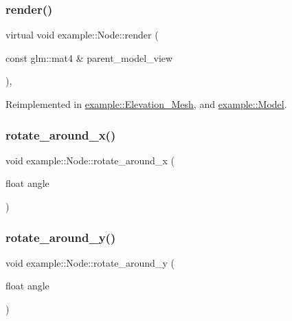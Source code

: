 \subsubsection{\texorpdfstring{render()}{render()}}
{\footnotesize\ttfamily virtual void example\+::\+Node\+::render (\begin{DoxyParamCaption}\item[{const glm\+::mat4 \&}]{parent\+\_\+model\+\_\+view }\end{DoxyParamCaption})\hspace{0.3cm}{\ttfamily [inline]}, {\ttfamily [virtual]}}



Reimplemented in \mbox{\hyperlink{classexample_1_1_elevation___mesh_a6af1c74193b5e68d638382caa08f1d1a}{example\+::\+Elevation\+\_\+\+Mesh}}, and \mbox{\hyperlink{classexample_1_1_model_ab280b30836095117f49acc5dfa92daf9}{example\+::\+Model}}.

\mbox{\label{classexample_1_1_node_ab4eff1ab9218668c46dcb2d436db93be}} 
\subsubsection{\texorpdfstring{rotate\+\_\+around\+\_\+x()}{rotate\_around\_x()}}
{\footnotesize\ttfamily void example\+::\+Node\+::rotate\+\_\+around\+\_\+x (\begin{DoxyParamCaption}\item[{float}]{angle }\end{DoxyParamCaption})\hspace{0.3cm}{\ttfamily [inline]}}

\mbox{\label{classexample_1_1_node_a0f0b0dcf74439bd1b31b7e86908586b5}} 
\subsubsection{\texorpdfstring{rotate\+\_\+around\+\_\+y()}{rotate\_around\_y()}}
{\footnotesize\ttfamily void example\+::\+Node\+::rotate\+\_\+around\+\_\+y (\begin{DoxyParamCaption}\item[{float}]{angle }\end{DoxyParamCaption})\hspace{0.3cm}{\ttfamily [inline]}}

